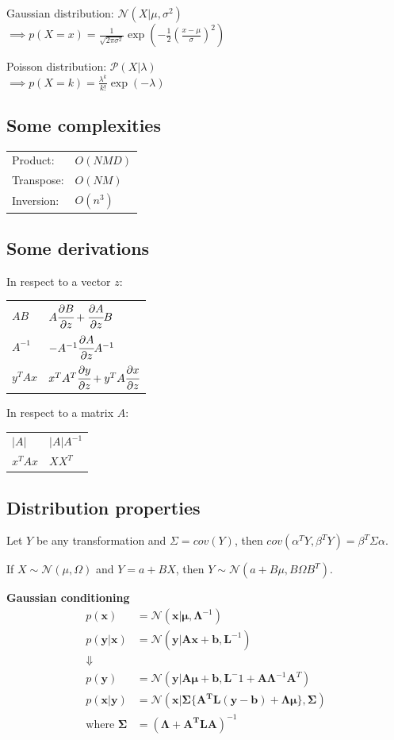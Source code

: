 \documentclass[10pt,a4paper,landscape]{article}
\renewcommand{\bf}[1]{\ensuremath{\mathbf{#1}}}
\begin{document}
\begin{multicols*}{4}
Gaussian distribution: $\mathcal{N}(X| \mu, \sigma^2)$ \\
$\implies p(X = x) = \frac{1}{\sqrt{2 \pi \sigma^2}} \exp{(- \frac{1}{2} ( \frac{x - \mu}{\sigma} )^2)}$

Poisson distribution: $\mathcal{P}(X| \lambda)$ \\
$\implies p(X = k) = \frac{\lambda ^ k}{k!} \exp{(- \lambda)}$

\subsection{Some complexities}
\begin{tabular}{l|l}
    Product:&$O(NMD)$\\
    Transpose:&$O(NM)$\\
    Inversion:&$O(n^3)$
\end{tabular}

\subsection{Some derivations}
In respect to a vector $z$:
\begin{tabular}{l|l}
  $AB$&$A\cfrac{\partial B}{\partial z} + \cfrac{\partial A}{\partial z} B$\\
  $A^{-1}$&$-A^{-1}\cfrac{\partial A}{\partial z}A^{-1}$\\
  $y^TAx$&$x^TA^T\cfrac{\partial y}{\partial z} + y^TA\cfrac{\partial x}{\partial z}$
\end{tabular}

In respect to a matrix $A$:

\begin{tabular}{l|l}
  $|A|$&$|A|A^{-1}$\\
  $x^TAx$&$XX^T$
\end{tabular}

\subsection{Distribution properties}
Let $Y$ be any transformation and $\Sigma = cov(Y)$, then $cov(\alpha^TY, \beta^TY) = \beta^T\Sigma\alpha$.

If $X\sim\mathcal{N}(\mu, \Omega)$ and $Y = a+BX$, then $Y\sim\mathcal{N}(a+B\mu, B\Omega B^T)$.

\textbf{Gaussian conditioning} 
\[
\begin{aligned}
p(\bf{x}) &= \mathcal{N}(\bf{x} | \boldsymbol\mu, \boldsymbol\Lambda^{-1}) \\
p(\bf{y}|\bf{x}) &= \mathcal{N}(\bf{y} | \bf{Ax + b, L}^{-1}) \\
\Downarrow \\
p(\bf{y}) &= \mathcal{N}(\bf{y} | \bf{A} \boldsymbol\mu + \bf{b}, \bf{L}^-1 + \bf{A} \boldsymbol\Lambda^{-1} \bf{A}^T)	\\
p(\bf{x}|\bf{y}) &= \mathcal{N}(\bf{x} |\boldsymbol\Sigma \{ \bf{A^T L(y - b) + \Lambda \mu} \}, \boldsymbol\Sigma) \\
\text{where } \boldsymbol\Sigma &= (\boldsymbol\Lambda + \bf{A^T L A})^{-1}
\end{aligned}
\]


\end{multicols*}
\end{document}
